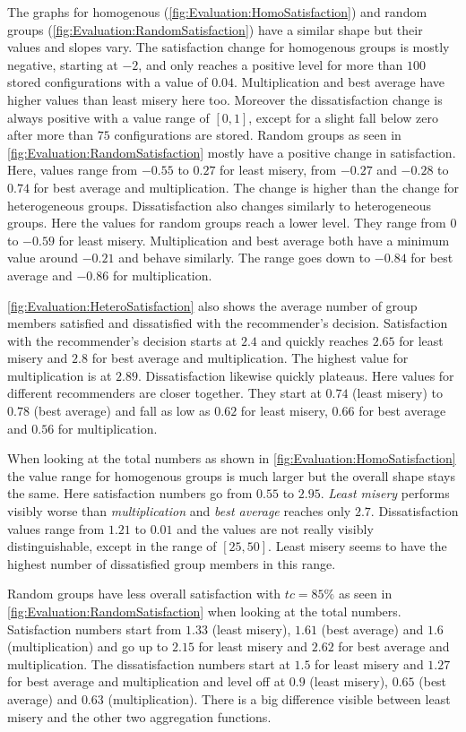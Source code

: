The graphs for homogenous (\autoref{fig:Evaluation:HomoSatisfaction}) and random groups (\autoref{fig:Evaluation:RandomSatisfaction}) have a similar shape but their values and slopes vary. The satisfaction change for homogenous groups is mostly negative, starting at $-2$, and only reaches a positive level for more than $100$ stored configurations with a value of $0.04$. Multiplication and best average have higher values than least misery here too. Moreover the dissatisfaction change is always positive with a value range of $[0,1]$, except for a slight fall below zero after more than $75$ configurations are stored.
Random groups as seen in \autoref{fig:Evaluation:RandomSatisfaction} mostly have a positive change in satisfaction. Here, values range from $-0.55$ to $0.27$ for least misery, from $-0.27$ and $-0.28$ to $0.74$ for best average and multiplication. The change is higher than the change for heterogeneous groups. Dissatisfaction also changes similarly to heterogeneous groups. Here the values for random groups reach a lower level. They range from $0$ to $-0.59$ for least misery. Multiplication and best average both have a minimum value around $-0.21$ and behave similarly. The range goes down to $-0.84$ for best average and $-0.86$ for multiplication.

\autoref{fig:Evaluation:HeteroSatisfaction} also shows the average number of group members satisfied and dissatisfied with the recommender's decision. Satisfaction with the recommender's decision starts at $2.4$ and quickly reaches $2.65$ for least misery and $2.8$ for best average and multiplication. The highest value for multiplication is at $2.89$. Dissatisfaction likewise quickly plateaus. Here values for different recommenders are closer together. They start at $0.74$ (least misery) to $0.78$ (best average) and fall as low as $0.62$ for least misery, $0.66$ for best average and $0.56$ for multiplication.

When looking at the total numbers as shown in \autoref{fig:Evaluation:HomoSatisfaction} the value range for homogenous groups is much larger but the overall shape stays the same. Here satisfaction numbers go from $0.55$ to $2.95$. \emph{Least misery} performs visibly worse than \emph{multiplication} and \emph{best average} reaches only $2.7$. Dissatisfaction values range from $1.21$ to $0.01$ and the values are not really visibly distinguishable, except in the range of $[25,50]$. Least misery seems to have the highest number of dissatisfied group members in this range.

Random groups have less overall satisfaction with $tc = 85\%$ as seen in \autoref{fig:Evaluation:RandomSatisfaction} when looking at the total numbers. Satisfaction numbers start from $1.33$ (least misery), $1.61$ (best average) and $1.6$ (multiplication) and go up to $2.15$ for least misery and $2.62$ for best average and multiplication. The dissatisfaction numbers start at $1.5$ for least misery and $1.27$ for best average and multiplication and level off at $0.9$ (least misery), $0.65$ (best average) and $0.63$ (multiplication). There is a big difference visible between least misery and the other two aggregation functions.

